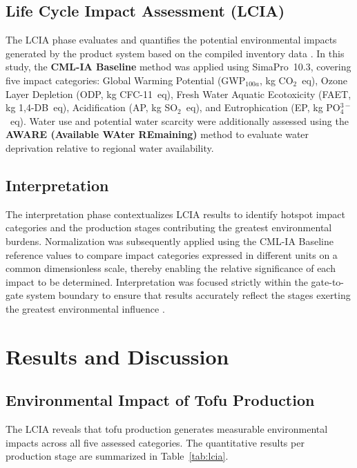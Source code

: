 \documentclass[12pt,a4paper]{article}
\begin{document}
\subsection{Life Cycle Impact Assessment (LCIA)}

The LCIA phase evaluates and quantifies the potential environmental impacts generated by the product
system based on the compiled inventory data \citep{Hauschild2017}. In this study, the
\textbf{CML-IA Baseline} method was applied using SimaPro~10.3, covering five impact categories:
Global Warming Potential (GWP$_{100a}$, kg CO$_2$~eq), Ozone Layer Depletion (ODP, kg CFC-11~eq),
Fresh Water Aquatic Ecotoxicity (FAET, kg 1,4-DB~eq), Acidification (AP, kg SO$_2$~eq), and
Eutrophication (EP, kg PO$_4^{3-}$~eq). Water use and potential water scarcity were additionally
assessed using the \textbf{AWARE (Available WAter REmaining)} method to evaluate water deprivation
relative to regional water availability.

\subsection{Interpretation}

The interpretation phase contextualizes LCIA results to identify hotspot impact categories and the
production stages contributing the greatest environmental burdens. Normalization was subsequently applied
using the CML-IA Baseline reference values to compare impact categories expressed in different units on
a common dimensionless scale, thereby enabling the relative significance of each impact to be
determined. Interpretation was focused strictly within the gate-to-gate system boundary to ensure that
results accurately reflect the stages exerting the greatest environmental influence \citep{Hauschild2017}.



\section{Results and Discussion}

\subsection{Environmental Impact of Tofu Production}

The LCIA reveals that tofu production generates measurable environmental impacts across all five
assessed categories. The quantitative results per production stage are summarized in
Table~\ref{tab:lcia}.
\end{document}
